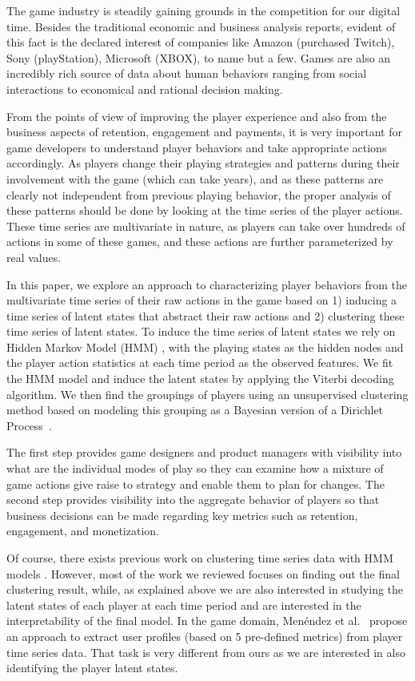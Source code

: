 The game industry is steadily gaining grounds in the competition for our digital time. Besides the traditional economic and business analysis reports, evident of this fact is the declared interest of companies like Amazon (purchased Twitch), Sony (playStation), Microsoft (XBOX), to name but a few.  Games are also an incredibly rich source of data about human behaviors ranging from social interactions to economical and rational decision making.

From the points of view of improving the player experience and also from the business aspects of retention, engagement  and payments, it is very important for game developers to understand  player behaviors and take appropriate actions accordingly. As players change their playing strategies and patterns during their involvement with the game (which can take years), and as these patterns are clearly not independent from previous playing behavior, the proper analysis of these patterns should be done by looking at the time series of the player actions. These time series are multivariate in nature, as players can take over hundreds of actions in some of these games, and these actions are further parameterized by real values.

In this paper, we explore an approach to characterizing player behaviors from the multivariate time series of their raw actions in the game based on 
1) inducing a time series of latent states that abstract their raw actions and 2) clustering these time series of latent states.  To induce the time series of latent states we rely on  Hidden Markov Model (HMM) \cite{hmm}, with the playing states as 
the hidden nodes and the player action statistics at each time period as the observed features.  We fit the HMM model and induce the latent  states by applying the Viterbi decoding algorithm.  We then find the groupings of players using an unsupervised clustering method based on modeling this grouping as a Bayesian version of a Dirichlet Process~\cite{}.

The first step provides game designers and product managers with visibility into what are the individual modes of play so they can examine how a mixture of game actions give raise to strategy and enable them to plan for changes.  The second step provides visibility into the aggregate behavior of players so that business decisions can be made regarding key metrics such as retention, engagement, and monetization. 

Of course, there exists previous work on clustering time series data with HMM models
\cite{Bicego2006,bicego2003,coviello2014}. However, most of the work we reviewed focuses on finding
out the final clustering result, while, as explained above we are also interested in studying
the latent states of each player at each time period and are interested in the interpretability of the final model. In the game domain, Men{\'e}ndez et al.~\cite{menendez2014} propose an approach to extract user profiles (based on 5 pre-defined metrics) from player time series data. That task is very different from ours
as we are interested in also identifying the player latent states. %


